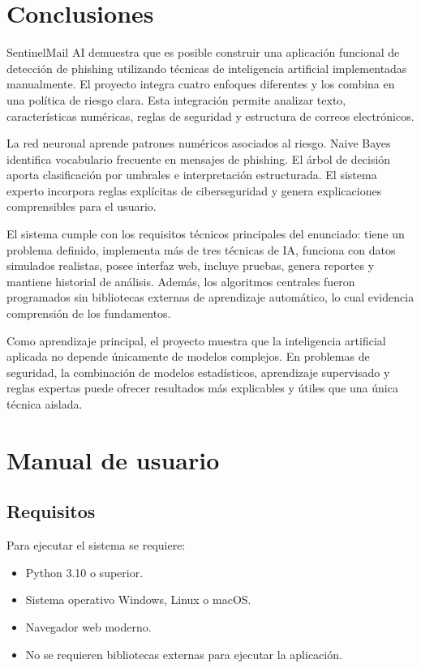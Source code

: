 \documentclass[12pt,letterpaper]{article}
\begin{document}
\section{Conclusiones}

SentinelMail AI demuestra que es posible construir una aplicación funcional de detección de phishing utilizando técnicas de inteligencia artificial implementadas manualmente. El proyecto integra cuatro enfoques diferentes y los combina en una política de riesgo clara. Esta integración permite analizar texto, características numéricas, reglas de seguridad y estructura de correos electrónicos.

La red neuronal aprende patrones numéricos asociados al riesgo. Naive Bayes identifica vocabulario frecuente en mensajes de phishing. El árbol de decisión aporta clasificación por umbrales e interpretación estructurada. El sistema experto incorpora reglas explícitas de ciberseguridad y genera explicaciones comprensibles para el usuario.

El sistema cumple con los requisitos técnicos principales del enunciado: tiene un problema definido, implementa más de tres técnicas de IA, funciona con datos simulados realistas, posee interfaz web, incluye pruebas, genera reportes y mantiene historial de análisis. Además, los algoritmos centrales fueron programados sin bibliotecas externas de aprendizaje automático, lo cual evidencia comprensión de los fundamentos.

Como aprendizaje principal, el proyecto muestra que la inteligencia artificial aplicada no depende únicamente de modelos complejos. En problemas de seguridad, la combinación de modelos estadísticos, aprendizaje supervisado y reglas expertas puede ofrecer resultados más explicables y útiles que una única técnica aislada.

\section{Manual de usuario}

\subsection{Requisitos}

Para ejecutar el sistema se requiere:

\begin{itemize}
    \item Python 3.10 o superior.
    \item Sistema operativo Windows, Linux o macOS.
    \item Navegador web moderno.
    \item No se requieren bibliotecas externas para ejecutar la aplicación.
\end{itemize}
\end{document}
